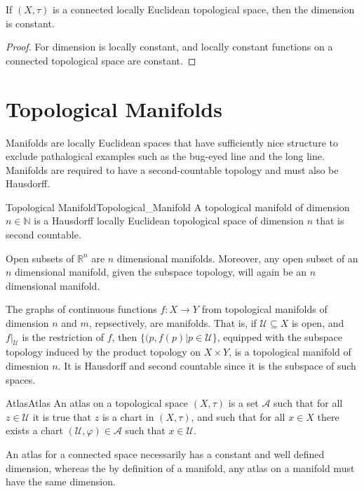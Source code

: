         \begin{theorem}
                If $(X,\tau)$ is a connected locally Euclidean topological
                space, then the dimension is constant.
        \end{theorem}
        \begin{proof}
                For dimension is locally constant, and locally constant
                functions on a connected topological space are constant.
        \end{proof}
\section{Topological Manifolds}
        Manifolds are locally Euclidean spaces that have sufficiently nice
        structure to exclude pathalogical examples such as the bug-eyed line
        and the long line. Manifolds are required to have a second-countable
        topology and must also be Hausdorff.
        \begin{fdefinition}{Topological Manifold}{Topological_Manifold}
            A topological manifold of dimension $n\in\mathbb{N}$ is a
            Hausdorff locally Euclidean topological space of dimension $n$
            that is second countable.
        \end{fdefinition}
        \begin{example}
            Open subsets of $\mathbb{R}^{n}$ are $n$ dimensional manifolds.
            Moreover, any open subset of an $n$ dimensional manifold, given the
            subspace topology, will again be an $n$ dimensional manifold.
        \end{example}
        \begin{example}
            The graphs of continuous functions $f:X\rightarrow{Y}$ from
            topological manifolds of dimension $n$ and $m$, repsectively, are
            manifolds. That is, if $\mathcal{U}\subseteq{X}$ is open, and
            $f|_{\mathcal{U}}$ is the restriction of $f$, then
            $\{(p,f(p)|p\in\mathcal{U}\}$, equipped with the subspace topology
            induced by the product topology on $X\times{Y}$, is a topological
            manifold of dimesnion $n$. It is Hausdorff and second countable
            since it is the subspace of such spaces.
        \end{example}
        \begin{fdefinition}{Atlas}{Atlas}
            An atlas on a topological space $(X,\tau)$ is a set
            $\mathcal{A}$ such that for all $z\in\mathcal{U}$ it is true
            that $z$ is a chart in $(X,\tau)$, and such that for all
            $x\in{X}$ there exists a chart
            $(\mathcal{U},\varphi)\in\mathcal{A}$ such that
            $x\in\mathcal{U}$.
        \end{fdefinition}
        An atlas for a connected space necessarily has a constant and well
        defined dimension, whereas the by definition of a manifold, any
        atlas on a manifold must have the same dimension.
